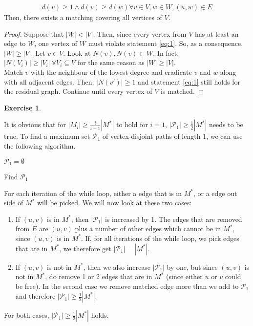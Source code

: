 \documentclass[a4paper,12pt,headsepline]{scrartcl}
\newtheorem{aufgabe}{Exercise}
\begin{document}
\begin{enumerate}
	\begin{align}
		d(v) \geq 1 \wedge d(v) \geq d(w) \forall v\in V, w\in W, (u,w) \in E\label{eq:1}
	\end{align}
	Then, there exists a matching covering all vertices of $V$.
	\begin{proof}
		Suppose that $|W| < |V|$. Then, since every vertex from $V$ has at least an edge to $W$, one vertex of $W$ must violate statement \ref{eq:1}. So, as a consequence, $|W| \geq |V|$. Let $v\in V$. Look at $N(v),N(v) \subset W$. In fact, $|N(V_i)| \geq |V_i|~ \forall V_i \subseteq V$ for the same reason as $|W| \geq|V|$.\\
		Match $v$ with the neighbour of the lowest degree and eradicate $v$ and $w$ along with all adjacent edges. Then, $|N(v')| \geq 1$ and statement \ref{eq:1} still holds for the residual graph. Continue until every vertex of $V$ is matched. 
	
	\end{proof}
\end{enumerate}
\newpage
\begin{aufgabe}
\end{aufgabe}

It is obvious that for $|M_i|\ge \frac{i}{i+1}|M^*|$ to hold for $i=1$, $|\mathcal P_1|\ge \frac 12 |M^*|$ needs to be true.
To find a maximum set $\mathcal P_1$ of vertex-disjoint paths of length 1, we can use the following algorithm.

\begin{algorithm}[H]
\SetAlgoLined
{}
$\mathcal P_1=\emptyset$\;
\caption{Find $\mathcal P_1$}
\end{algorithm}

For each iteration of the while loop, either a edge that is in $M^*$, or a edge out side of $M^*$ will be picked.
We will now look at these two cases:
\begin{enumerate}
    \item If $(u,v)$ is in $M^*$, then $|\mathcal P_1|$ is increased by 1.
        The edges that are removed from $E$ are $(u,v)$ plus a number of other edges which cannot be in $M^*$, since $(u,v)$ is in $M^*$.
        If, for all iterations of the while loop, we pick edges that are in $M^*$, we therefore get $|\mathcal P_1|=|M^*|$.
    \item If $(u,v)$ is not in $M^*$, then we also increase $|\mathcal P_1|$ by one, but since $(u,v)$ is not in $M^*$, do remove 1 or 2 edges that are in $M^*$ (since either $u$ or $v$ could be free).
        In the second case we remove matched edge more than we add to $\mathcal P_1$ and therefore $|\mathcal P_1|\ge \frac 12 |M^*|$.
\end{enumerate}
For both cases, $|\mathcal P_1|\ge \frac 12 |M^*|$ holds.
\end{document}
